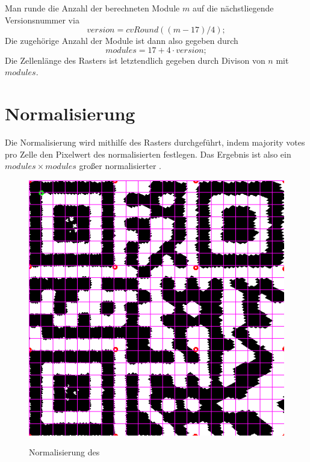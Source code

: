 Man runde die Anzahl der berechneten Module $m$ auf die nächstliegende Versionsnummer via
\begin{equation}
	version = cvRound((m-17)/4);
\end{equation}
Die zugehörige Anzahl der Module ist dann also gegeben durch
\begin{equation}
	modules = 17+4 \cdot version;
\end{equation} 
Die Zellenlänge des Rasters ist letztendlich gegeben durch Divison von $n$ mit $modules$.

\section{Normalisierung}
Die Normalisierung wird mithilfe des Rasters durchgeführt, indem majority votes pro Zelle den Pixelwert des normalisierten \QRCodes festlegen.
Das Ergebnis ist also ein $modules \times modules$ großer normalisierter \QRCode.
\begin{figure}[h]
\centering
\includegraphics[scale=0.3]{images/gitter.png}
\label{fig:version-qrcode}\caption{Normalisierung des \QRCode}
\end{figure}

